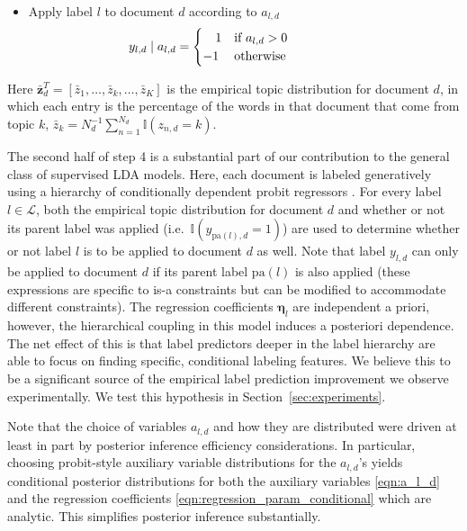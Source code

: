 \begin{enumerate}
\begin{itemize}
\begin{itemize}
\item Apply label $l$ to document $d$ according to $a_{l,d}$ \[\hspace{-2cm}
y_{l,d}\mid a_{l,d}=\begin{cases}
\ \ \ 1 & \text{if \ensuremath{a_{l,d}>0}} \\%
-1 & \text{otherwise}\end{cases}\]
 
\end{itemize}
\end{itemize}
\end{enumerate}


Here $\bar{\mathbf{z}}_d^T = [\bar{z}_{1}, \ldots, \bar{z}_k, \ldots, \bar{z}_K]$ is the empirical topic distribution for document $d$, in which each entry is the percentage of the words in that document that come from topic $k$, $\bar{z}_{k}=N_{d}^{-1}\sum_{n=1}^{N_d}\mathbb{I}(z_{n,d}=k).$ 

The second half of step 4 is a substantial part of our contribution to the
general class of supervised LDA models.  Here, each document is labeled generatively using a hierarchy of conditionally dependent probit regressors \cite{gelmanbda04}.  For every label $l \in \mathcal{L}$, both the empirical topic distribution for document $d$ and whether or not its parent label was applied (i.e.~$\mathbb{I}(y_{\mathrm{pa}(l),d}=1)$) are used to determine whether or not  label $l$ is to be applied to  document $d$ as well.  Note that label $y_{l,d}$ can only be applied to document $d$ if its parent label $\mathrm{pa}(l)$ is also applied (these expressions are specific to is-a constraints but can be modified to accommodate different constraints).  The regression coefficients $\boldsymbol\eta_l$ are independent a priori, however, the hierarchical coupling in this model induces a posteriori dependence.   The net effect of this is that label predictors deeper in the label hierarchy are able to focus on finding specific, conditional labeling features.  We believe this to be a significant source of the empirical label prediction improvement we observe experimentally.  We test this hypothesis in Section~\ref{sec:experiments}.

Note that the choice of variables $a_{l,d}$ and how they are distributed were  driven at least in part by posterior inference efficiency considerations.  In particular, choosing probit-style auxiliary variable distributions for the $a_{l,d}$'s  yields conditional posterior distributions for both the auxiliary variables \eqref{eqn:a_l_d} and the regression coefficients \eqref{eqn:regression_param_conditional} which are analytic.  This simplifies posterior inference substantially.

